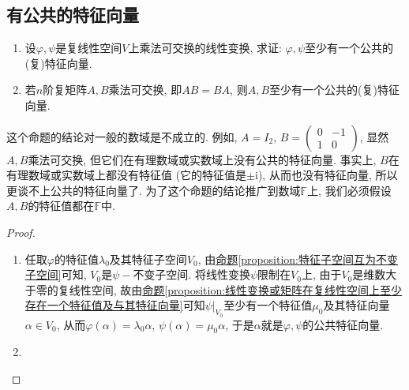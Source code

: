 \documentclass[../../main.tex]{subfiles}%
\begin{document}
\subsection{有公共的特征向量}

\begin{proposition}\label{proposition:乘法可交换必有公共的特征向量}
\begin{enumerate}
\item 设\(\varphi,\psi\)是复线性空间\(V\)上乘法可交换的线性变换, 求证: \(\varphi,\psi\)至少有一个公共的(复)特征向量.

\item 若\(n\)阶复矩阵\(A,B\)乘法可交换, 即\(AB = BA\), 则\(A,B\)至少有一个公共的(复)特征向量. 
\end{enumerate}
\end{proposition}
\begin{remark}
这个命题的结论对一般的数域是不成立的. 例如, \(A = I_{2}\), \(B=\begin{pmatrix}
0& -1\\
1& 0
\end{pmatrix}\), 显然\(A,B\)乘法可交换, 但它们在有理数域或实数域上没有公共的特征向量. 事实上, \(B\)在有理数域或实数域上都没有特征值 (它的特征值是\(\pm\mathrm{i}\)), 从而也没有特征向量, 所以更谈不上公共的特征向量了. 为了这个命题的结论推广到数域\(\mathbb{F}\)上, 我们必须假设\(A,B\)的特征值都在\(\mathbb{F}\)中.
\end{remark}
\begin{proof}
\begin{enumerate}
\item 任取\(\varphi\)的特征值\(\lambda_{0}\)及其特征子空间\(V_{0}\), 由\hyperref[proposition:特征子空间互为不变子空间]{命题\ref{proposition:特征子空间互为不变子空间}}可知, \(V_{0}\)是\(\psi -\)不变子空间. 将线性变换\(\psi\)限制在\(V_{0}\)上, 由于\(V_{0}\)是维数大于零的复线性空间, 故由\hyperref[proposition:线性变换或矩阵在复线性空间上至少存在一个特征值及与其特征向量]{命题\ref{proposition:线性变换或矩阵在复线性空间上至少存在一个特征值及与其特征向量}}可知\(\psi|_{V_{0}}\)至少有一个特征值\(\mu_{0}\)及其特征向量\(\alpha \in V_{0}\), 从而\(\varphi(\alpha)=\lambda_{0}\alpha\), \(\psi(\alpha)=\mu_{0}\alpha\), 于是\(\alpha\)就是\(\varphi,\psi\)的公共特征向量. 

\item 
\end{enumerate}
\end{proof}
\end{document}
